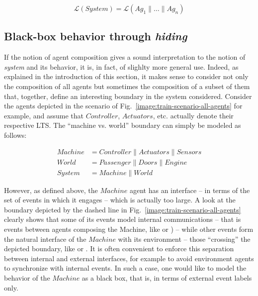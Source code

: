 \begin{equation}
\mathcal{L}(System) = \mathcal{L}(Ag_1 \parallel \ldots \parallel Ag_n)
\label{equation:system-composition}
\end{equation}

\subsection{Black-box behavior through \emph{hiding}}

If the notion of agent composition gives a sound interpretation to the notion of \emph{system} and its behavior, it is, in fact, of slighlty more general use. Indeed, as explained in the introduction of this section, it makes sense to consider not only the composition of all agents but sometimes the composition of a subset of them that, together, define an interesting boundary in the system considered. Consider the agents depicted in the scenario of Fig.~\ref{image:train-scenario-all-agents} for example, and assume that $Controller$, $Actuators$, etc. actually denote their respective LTS. The ``machine vs. world'' boundary can simply be modeled as follows:

\vspace{-0.8cm}
\begin{align*}
Machine &= Controller \parallel Actuators \parallel Sensors \\
World   &= Passenger \parallel Doors \parallel Engine \\
System  &= Machine \parallel World
\end{align*}
\vspace{-0.8cm}

However, as defined above, the $Machine$ agent has an interface -- in terms of the set of events in which it engages -- which is actually too large. A look at the boundary depicted by the dashed line in Fig.~\ref{image:train-scenario-all-agents} clearly shows that some of its events model internal communications -- that is events between agents composing the Machine, like  or ) -- while other events form the natural interface of the $Machine$ with its environment -- those ``crossing'' the depicted boundary, like  or . It is often convenient to enforce this separation between internal and external interfaces, for example to avoid environment agents to synchronize with internal events. In such a case, one would like to model the behavior of the $Machine$ as a black box, that is, in terms of external event labels only.

